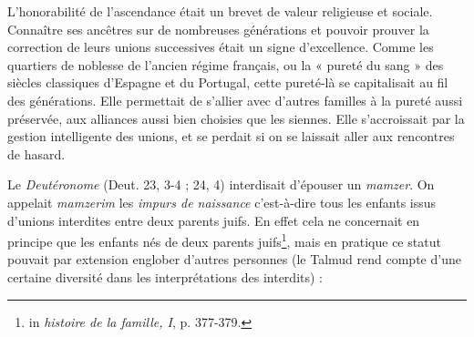  
 L'honorabilité de l'ascendance était un brevet de valeur religieuse et sociale. Connaître ses ancêtres sur de nombreuses générations et pouvoir prouver la correction de leurs unions successives était un signe d'excellence. Comme les quartiers de noblesse de l'ancien régime français, ou la « pureté du sang » des siècles classiques d'Espagne et du Portugal, cette pureté-là se capitalisait au fil des générations. Elle permettait de s'allier avec d'autres familles à la pureté aussi préservée, aux alliances aussi bien choisies que les siennes. Elle s'accroissait par la gestion intelligente des unions, et se perdait si on se laissait aller aux rencontres de hasard. 

 

 
 Le \emph{Deutéronome} (Deut. 23, 3-4 ; 24, 4) interdisait d'épouser un \emph{mamzer}. On appelait \emph{mamzerim} les \emph{impurs de naissance}  c'est-à-dire tous les enfants issus d'unions interdites entre deux parents juifs. En effet cela ne concernait en principe que les enfants nés de deux parents juifs\footnote{in \emph{histoire de la famille, I}, p. 377-379. }, mais en pratique ce statut pouvait par extension englober d'autres personnes (le Talmud rend compte d'une certaine diversité dans les interprétations des interdits) : 
